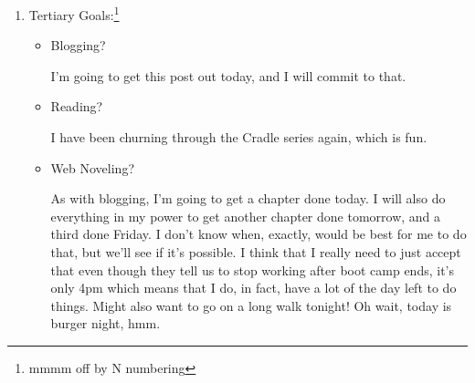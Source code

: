 \documentclass[12pt]{article}
\newcommand{\say}[1]{``#1''}
\renewcommand{\,}{\textsuperscript{,}}
\begin{document}
\begin{enumerate}
\begin{itemize}
I realized yesterday that I want stepwise and fourth-wise motions.  
If I limit myself to major chords, that means that I only have twelve chords at most, and since most of them are symmetric\footnote{going from A to B is the same as B to A in reverse, give or take}, there's really not that much to do.  
Since I don't realllly want to be moving all around the neck, that limits the chords even further.  
That being said, I do still need to be spending time on it.

\item Travel plans?

Nope!

\item Talks for parks?

Signed up for a few more, so I think that I've officially set up at least as many talks this summer as I have before this summer.

\item Other requested talks?

Not at all!

\item Talks for conferences?

Yesterday while in my mood of existential dread I made the \say{dream talk, minimal viable talk, realistic talk, stretch talk} outline.\footnote{read: this is what I need to do in order to have the content for the talk which satisfies each of the sets of goals}  
I have about a month until the conference, which is both too long to feel urgent and also not long enough to be able to feel comfortable with procrastinating it in full.

\end{itemize}

\item Tertiary Goals:\footnote{mmmm off by N numbering}

\begin{itemize}

\item Blogging?

I'm going to get this post out today, and I will commit to that.

\item Reading?

I have been churning through the Cradle series again, which is fun.

\item Web Noveling?

As with blogging, I'm going to get a chapter done today.  
I will also do everything in my power to get another chapter done tomorrow, and a third done Friday.  
I don't know when, exactly, would be best for me to do that, but we'll see if it's possible.  
I think that I really need to just accept that even though they tell us to stop working after boot camp ends, it's only 4pm which means that I do, in fact, have a lot of the day left to do things.  
Might also want to go on a long walk tonight!  
Oh wait, today is burger night, hmm.


\end{itemize}
\end{enumerate}
\end{document}
